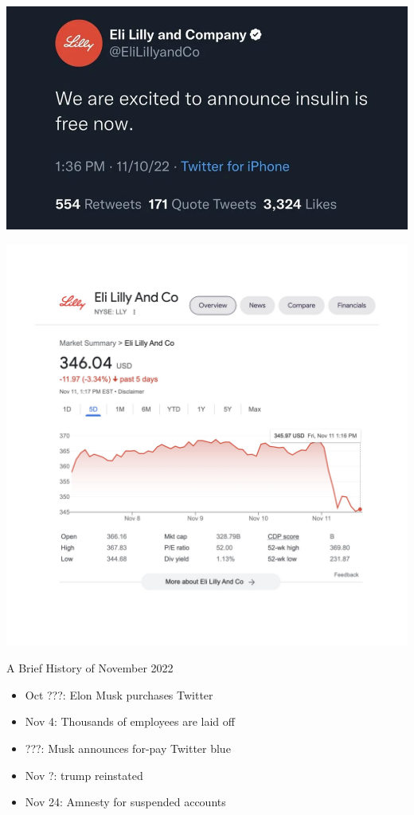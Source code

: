 \documentclass{beamer}
\begin{document}
\begin{frame}
	\includegraphics[width = \textwidth]{free-insulin}
\end{frame}

\begin{frame}
	\includegraphics[width = \textwidth]{eli-lilly-stock}
\end{frame}

\begin{frame}{A Brief History of November 2022}
	\begin{itemize}
	\item Oct ???: Elon Musk purchases Twitter
	\item Nov 4: Thousands of employees are laid off
	\item ???: Musk announces for-pay Twitter blue
	\pause
	\item Nov ?: trump reinstated
	\pause
	\item Nov 24: Amnesty for suspended accounts	
	
	\end{itemize}
\end{frame}
\end{document}
